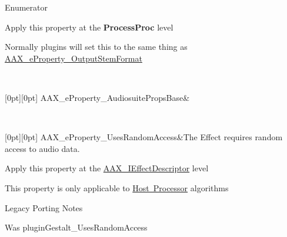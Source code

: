 \begin{DoxyEnumFields}{Enumerator}
\begin{DoxyItemize}
\item Apply this property at the {\bfseries{Process\+Proc}} level \item Normally plugins will set this to the same thing as \mbox{\hyperlink{a00662_a13e384f22825afd3db6d68395b79ce0da211fdc6277e7fa652b5d482e810b0bc9}{A\+A\+X\+\_\+e\+Property\+\_\+\+Output\+Stem\+Format}} \end{DoxyItemize}
\\
\hline

[0pt][0pt]{}\mbox{\label{a00662_a13e384f22825afd3db6d68395b79ce0dae774ad8d49f9d021fc39e7d9c6f08070}} 
A\+A\+X\+\_\+e\+Property\+\_\+\+Audiosuite\+Props\+Base&

 \\
\hline

[0pt][0pt]{}\mbox{\label{a00662_a13e384f22825afd3db6d68395b79ce0dab0bbaabe0a03b37e5a69f04a6f306076}} 
A\+A\+X\+\_\+e\+Property\+\_\+\+Uses\+Random\+Access&The Effect requires random access to audio data. \begin{DoxyItemize}
\item Apply this property at the \mbox{\hyperlink{a01813}{A\+A\+X\+\_\+\+I\+Effect\+Descriptor}} level \item This property is only applicable to \mbox{\hyperlink{a00804}{Host Processor}} algorithms\end{DoxyItemize}
\begin{DoxyRefDesc}{Legacy Porting Notes}
\item[\mbox{\hyperlink{a00787__porting_notes000047}{Legacy Porting Notes}}]Was plugin\+Gestalt\+\_\+\+Uses\+Random\+Access \end{DoxyRefDesc}
\\
\hline


\end{DoxyEnumFields}
